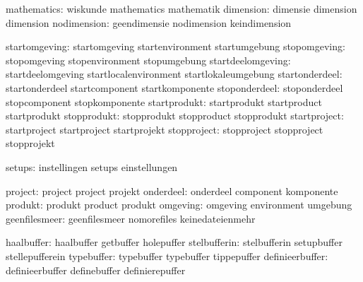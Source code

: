                   mathematics:  wiskunde                     mathematics
                                mathematik
                    dimension:  dimensie                     dimension
                                dimension
                  nodimension:  geendimensie                 nodimension
                                keindimension

                startomgeving:  startomgeving                startenvironment
                                startumgebung
                 stopomgeving:  stopomgeving                 stopenvironment
                                stopumgebung
            startdeelomgeving:  startdeelomgeving            startlocalenvironment
                                startlokaleumgebung
               startonderdeel:  startonderdeel               startcomponent
                                startkomponente
                stoponderdeel:  stoponderdeel                stopcomponent
                                stopkomponente
                 startprodukt:  startprodukt                 startproduct
                                startprodukt
                  stopprodukt:  stopprodukt                  stopproduct
                                stopprodukt
                 startproject:  startproject                 startproject
                                startprojekt
                  stopproject:  stopproject                  stopproject
                                stopprojekt

                       setups:  instellingen                 setups
                                einstellungen

                      project:  project                      project
                                projekt
                    onderdeel:  onderdeel                    component
                                komponente
                      produkt:  produkt                      product
                                produkt
                     omgeving:  omgeving                     environment
                                umgebung
                geenfilesmeer:  geenfilesmeer                nomorefiles
                                keinedateienmehr

                   haalbuffer:  haalbuffer                   getbuffer
                                holepuffer
                 stelbufferin:  stelbufferin                 setupbuffer
                                stellepufferein
                   typebuffer:  typebuffer                   typebuffer
                                tippepuffer
              definieerbuffer:  definieerbuffer              definebuffer
                                definierepuffer %

